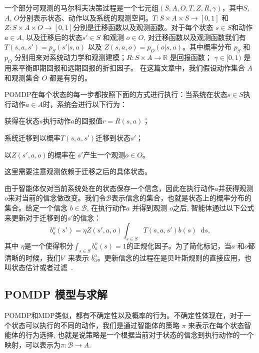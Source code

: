 \documentclass{article}
\newcommand{\reals}{\mathbb{R}}
\newcommand{\states}{S}
\newcommand{\actions}{A}
\newcommand{\observables}{O}
\newcommand{\trans}{T}
\newcommand{\obs}{Z}
\newcommand{\reward}{R}
\newcommand{\discount}{\gamma}
\newcommand{\beliefs}{\mathcal{B}}
\newcommand{\policy}{\pi}
\newcommand{\diff}[1]{\mathop{}\!\mathrm{d}#1}
\begin{document}
一个部分可观测的马尔科夫决策过程是一个七元组$(\states, \actions, \observables, \trans, \obs, \reward, \discount)$，其中$\states$, $\actions$, $\observables$分别表示状态、动作以及系统的观测空间。$\trans \colon \states \times \actions \times \states \to [0,1]$ 和 $\obs \colon \states \times \actions \times \observables \to [0,1]$分别是迁移函数以及观测函数。对于每个状态 $s \in \states$和动作 $a \in \actions$, 以及迁移后的状态$s' \in \states$ 和观测 $o \in \observables$, 对迁移函数以及观测函数我们有$\trans(s, a, s') = p_{\states}(s' | s, a)$ 以及 $\obs(s, a, o) = p_{\observables}(o | s, a)$。其中概率分布 $p_{\states}$ 和 $p_{\observables}$ 分别用来对系统动力学和观测建模；$\reward \colon \states \times \actions \to \reals$ 是回报函数；
$\discount \in [0,1)$ 是用来平衡即期回报和远期回报的折扣因子。 在这篇文章中，我们假设动作集合 $\actions$ 和观测集合 $\observables$ 都是有穷的。

POMDP在每个状态的每一步都按照下面的方式进行执行：当系统在状态$s \in \states$执行动作$a \in \actions$时，系统会进行以下行为：
\begin{inparaenum}[1)]
\item
	获得在状态$s$执行动作$a$的回报值$r = \reward(s,a)$；
\item
	系统迁移到以概率$\trans(s, a, s')$迁移到状态$s'$；
\item
	以$\obs(s', a, o)$的概率在 $s'$产生一个观测$o \in \observables$。
\end{inparaenum}
这里需要注意观测依赖于迁移之后的具体状态。

由于智能体仅对当前系统处在的状态保存一个信念，因此在执行动作$a$并获得观测$o$来对当前的信念做改变。我们令$\beliefs$表示信念的集合，也就是状态上的概率分布的集合。给定一个信念 $b \in \beliefs$, 在执行动作$a$ 并得到观测 $o$之后, 智能体通过以下公式来更新对于迁移到的$s'$的信念：
\begin{equation} 
	b^{o}_{a}(s') = \eta \obs(s', a, o) \int_{s \in \states} \trans(s, a, s')  b(s) \diff{s},
	\label{eq:beliefUpdate}
\end{equation}
其中 $\eta$是一个使得积分$\int_{s \in \states} b^{o}_{a}(s) = 1$的正规化因子。为了简化标记，当$a$ 和$o$都清晰的时候，我们$b'$ 来表示 $b^{o}_{a}$。更新信念的过程在是贝叶斯规则的直接应用，也叫状态估计或者过滤~\cite{book}.

\subsection{POMDP 模型与求解}

POMDP和MDP类似，都有不确定性以及概率的行为。不确定性体现在，对于一个状态可以执行的不同的动作，我们是通过智能体的策略 $\policy$ 来表示在每个状态智能体的行为选择, 也就是说策略是一个根据当前对于状态的信念到执行动作的一个映射，可以表示为$\policy \colon \beliefs \to \actions$.
\end{document}
